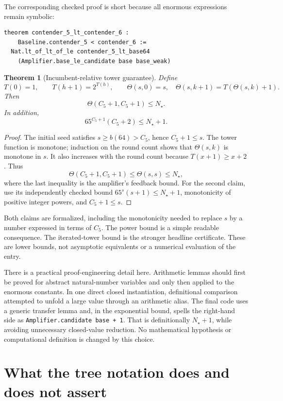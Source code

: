 \documentclass[11pt,letterpaper]{article}
\newtheorem{theorem}{Theorem}[section]
\theoremstyle{definition}
\newcommand{\Cfive}{\ensuremath{C_5}}
\newcommand{\Cnew}{\ensuremath{N_\star}}
\newcommand{\code}[1]{\texttt{#1}}
\begin{document}
The corresponding checked proof is short because all enormous expressions
remain symbolic:
\begin{Verbatim}[frame=single,fontsize=\small,breaklines=true]
theorem contender_5_lt_contender_6 :
    Baseline.contender_5 < contender_6 :=
  Nat.lt_of_lt_of_le contender_5_lt_base64
    (Amplifier.base_le_candidate base base_weak)
\end{Verbatim}

\begin{theorem}[Incumbent-relative tower guarantee]
\label{thm:tower}
Define
\[
 T(0)=1,\qquad T(h+1)=2^{T(h)},
 \qquad
 \Theta(s,0)=s,\quad\Theta(s,k+1)=T(\Theta(s,k)+1).
\]
Then
\[
 \boxed{\Theta(\Cfive+1,\Cfive+1)\le\Cnew.}
\]
In addition,
\[
 65^{\Cfive+1}(\Cfive+2)\le\Cnew+1.
\]
\end{theorem}
\begin{proof}
The initial seed satisfies \(s\ge b(64)>\Cfive\), hence
\(\Cfive+1\le s\). The tower function is monotone; induction on the round
count shows that \(\Theta(s,k)\) is monotone in \(s\). It also increases
with the round count because \(T(x+1)\ge x+2\).
Thus
\[
 \Theta(\Cfive+1,\Cfive+1)\le\Theta(s,s)\le\Cnew,
\]
where the last inequality is the amplifier's feedback bound. For the second
claim, use its independently checked bound
\(65^s(s+1)\le\Cnew+1\), monotonicity of positive integer powers, and
\(\Cfive+1\le s\).
\end{proof}

Both claims are formalized, including the monotonicity needed to replace
\(s\) by a number expressed in terms of \Cfive. The power bound is a simple
readable consequence. The iterated-tower bound is the stronger headline
certificate. These are lower bounds, not asymptotic equivalents or a numerical
evaluation of the entry.

There is a practical proof-engineering detail here. Arithmetic lemmas should
first be proved for abstract natural-number variables and only then applied
to the enormous constants. In one direct closed instantiation, definitional
comparison attempted to unfold a large value through an arithmetic alias.
The final code uses a generic transfer lemma and, in the exponential bound,
spells the right-hand side as \code{Amplifier.candidate base + 1}. That is
definitionally \(\Cnew+1\), while avoiding unnecessary closed-value reduction.
No mathematical hypothesis or computational definition is changed by this
choice.

\section{What the tree notation does and does not assert}
\label{sec:ordinal}
\end{document}
